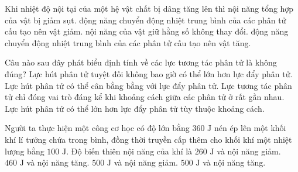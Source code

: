 \begin{ex}%
	Khi nhiệt độ nội tại của một hệ vật chất bị dâng tăng lên thì
	\choice
	{nội năng tổng hợp của vật bị giảm sụt.}
	{động năng chuyển động nhiệt trung bình của các phân tử cấu tạo nên vật giảm.}
	{nội năng của vật giữ hằng số không thay đổi.}
	{\True động năng chuyển động nhiệt trung bình của các phân tử cấu tạo nên vật tăng.}
\end{ex}

\begin{ex}%
	Câu nào sau đây phát biểu định tính về các lực tương tác phân tử là không đúng?
	\choice
	{\True Lực hút phân tử tuyệt đối không bao giờ có thể lớn hơn lực đẩy phân tử.}
	{Lực hút phân tử có thể cân bằng bằng với lực đẩy phân tử.}
	{Lực tương tác phân tử chỉ đóng vai trò đáng kể khi khoảng cách giữa các phân tử ở rất gần nhau.}
	{Lực hút phân tử có thể lớn hơn lực đẩy phân tử tùy thuộc khoảng cách.}
\end{ex}

\begin{ex}%
	Người ta thực hiện một công cơ học có độ lớn bằng $360\text{ J}$ nén ép lên một khối khí lí tưởng chứa trong bình, đồng thời truyền cấp thêm cho khối khí một nhiệt lượng bằng $100\text{ J}$. Độ biến thiên nội năng của khí là
	\choice
	{$260\text{ J}$ và nội năng giảm.}
	{\True $460\text{ J}$ và nội năng tăng.}
	{$500\text{ J}$ và nội năng giảm.}
	{$500\text{ J}$ và nội năng tăng.}
\end{ex}


